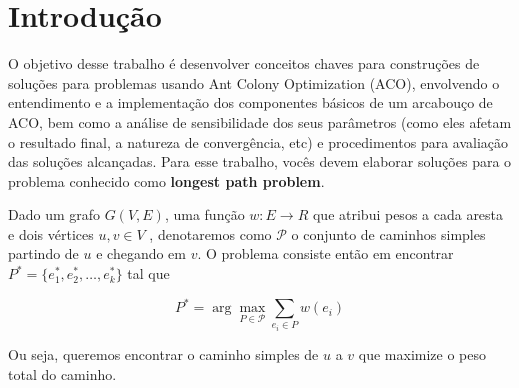 \section{Introdução}

O objetivo desse trabalho é desenvolver conceitos chaves para construções de soluções para
problemas usando Ant Colony Optimization (ACO), envolvendo o entendimento e a implementação
dos componentes básicos de um arcabouço de ACO, bem como a análise de sensibilidade dos seus
parâmetros (como eles afetam o resultado final, a natureza de convergência,
etc) e procedimentos para avaliação das soluções alcançadas. Para esse trabalho, vocês devem
elaborar soluções para o problema conhecido como \textbf{longest path problem}.

Dado um grafo $G(V, E)$, uma função $w : E \rightarrow R$ que atribui pesos a cada aresta e dois vértices $u, v \in V$ ,
denotaremos como $\mathcal{P}$ o conjunto de caminhos simples partindo de $u$ e chegando em $v$.
O problema consiste então em encontrar
$P^* = \{e_1^*, e_2^*, \dots, e_k^*\}$
tal que

$$P^* = \arg \max\limits_{P \in \mathcal{P}} \sum\limits_{e_i \in P} w(e_i)$$

Ou seja, queremos encontrar o caminho simples de $u$ a $v$ que maximize o peso total do
caminho.
